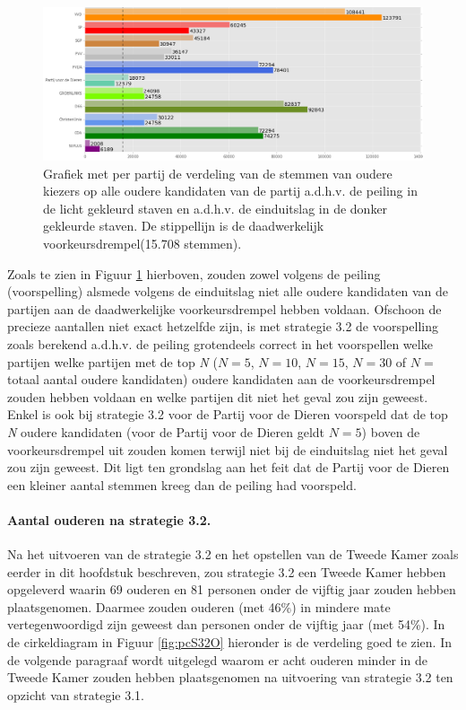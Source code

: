 \begin{figure}[H]

	\includegraphics[width=\linewidth]{stemmen_op_ouderen_eigenX_samen.png}

			\caption{Grafiek met per partij de verdeling van de stemmen van oudere kiezers op alle oudere kandidaten van de partij a.d.h.v. de peiling \citep{IPSOS} in de licht gekleurd staven en a.d.h.v. de einduitslag \citep{Kiesraad_databank} in de donker gekleurde staven. De stippellijn is de daadwerkelijk voorkeursdrempel(15.708 stemmen).}

\label{fig:stemmenS32O}
\end{figure}

Zoals te zien in Figuur \ref{fig:stemmenS32O} hierboven, zouden zowel volgens de peiling (voorspelling) alsmede volgens de einduitslag niet alle oudere kandidaten van de partijen aan de daadwerkelijke voorkeursdrempel hebben voldaan. Ofschoon de precieze aantallen niet exact hetzelfde zijn, is met strategie 3.2 de voorspelling zoals berekend a.d.h.v. de peiling grotendeels correct in het voorspellen welke partijen welke partijen met de top \textit{N} ($N=5$, $N=10$, $N=15$, $N=30$ of $N=$totaal aantal oudere kandidaten) oudere kandidaten aan de voorkeursdrempel zouden hebben voldaan en welke partijen dit niet het geval zou zijn geweest. Enkel is ook bij strategie 3.2 voor de Partij voor de Dieren voorspeld dat de top \textit{N} oudere kandidaten (voor de Partij voor de Dieren geldt $N=5$) boven de voorkeursdrempel uit zouden komen terwijl niet bij de einduitslag niet het geval zou zijn geweest. Dit ligt ten grondslag aan het feit dat de Partij voor de Dieren een kleiner aantal stemmen kreeg dan de peiling had voorspeld. 


\paragraph{Aantal ouderen na strategie 3.2.}
Na het uitvoeren van de strategie 3.2 en het opstellen van de Tweede Kamer zoals eerder in dit hoofdstuk beschreven, zou strategie 3.2 een Tweede Kamer hebben opgeleverd waarin 69 ouderen en 81 personen onder de vijftig jaar zouden hebben plaatsgenomen. Daarmee zouden ouderen (met 46\%) in mindere mate vertegenwoordigd zijn geweest dan personen onder de vijftig jaar (met 54\%). In de cirkeldiagram in Figuur \ref{fig:pcS32O} hieronder is de verdeling goed te zien. In de volgende paragraaf wordt uitgelegd waarom er acht ouderen minder in de Tweede Kamer zouden hebben plaatsgenomen na uitvoering van strategie 3.2 ten opzicht van strategie 3.1.

